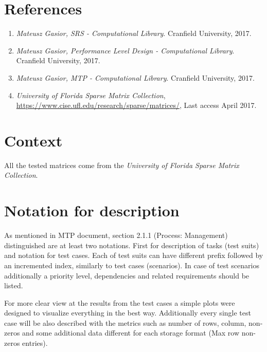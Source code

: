 \section{References} \label{s:introduction:references}
	\begin{comment}
		List all of the applicable reference documents. The references are separated into “external” references
		that are imposed external to the project and “internal” references that are imposed from within to the
		project. This may also be at the end of the document.
	\end{comment}
	\begin{enumerate}
		\item \emph{Mateusz Gasior, \gls{SRS} - Computational Library}. Cranfield University, 2017.
		\item \emph{Mateusz Gasior, Performance Level Design - Computational Library}. Cranfield University, 2017.
		\item \emph{Mateusz Gasior, \gls{MTP} - Computational Library}. Cranfield University, 2017.
		\item \emph{University of Florida Sparse Matrix Collection}, \url{https://www.cise.ufl.edu/research/sparse/matrices/}, Last access April 2017.
	\end{enumerate}
\section{Context} \label{s:introduction:context}
	\begin{comment}
		Provide any required context that is not already covered by other sections of this document (e.g., thirdparty
		testing via the Internet).
	\end{comment}
	All the tested matrices come from the \emph{University of Florida Sparse Matrix Collection}.
\section{Notation for description} \label{s:introduction:notation-for-description}
	\begin{comment}
		Define any numbering schemes, e.g., for scenarios and test cases. The intent of this section is to
		explain any such schema.
	\end{comment}
	As mentioned in \gls{MTP} document, section 2.1.1 (Process: Management) distinguished are at least two notations. First for description of tasks (test suits) and notation for test cases. Each of test suits can have different prefix followed by an incremented index, similarly to test cases (scenarios). In case of test scenarios additionally a priority level, dependencies and related requirements should be listed.
	
	For more clear view at the results from the test cases a simple plots were designed to visualize everything in the best way. Additionally every single test case will be also described with the metrics such as number of rows, column, non-zeros and some additional data different for each storage format (Max row non-zeros entries).
	